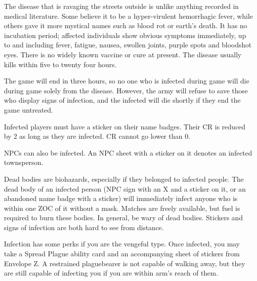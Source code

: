 \documentclass[green]{guildcamp4}
\begin{document}
\name{\gInfection{}}

The disease that is ravaging the streets outside is unlike anything recorded in medical literature. Some believe it to be a hyper-virulent hemorrhagic fever, while others gave it more mystical names such as blood rot or earth's death. It has no incubation period; affected individuals show obvious symptoms immediately, up to and including fever, fatigue, nausea, swollen joints, purple spots and bloodshot eyes. There is no widely known vaccine or cure at present. The disease usually kills within five to twenty four hours.

The game will end in three hours, so no one who is infected during game will die during game solely from the disease. However, the army will refuse to save those who display signs of infection, and the infected will die shortly if they end the game untreated.

Infected players must have a sticker on their name badges. Their CR is reduced by 2 as long as they are infected. CR cannot go lower than 0.

NPCs can also be infected. An NPC sheet with a sticker on it denotes an infected townsperson.

Dead bodies are biohazards, especially if they belonged to infected people. The dead body of an infected person (NPC sign with an X and a sticker on it, or an abandoned name badge with a sticker) will immediately infect anyone who is within one ZOC of it without a mask. Matches are freely available, but fuel is required to burn these bodies. In general, be wary of dead bodies. Stickers and signs of infection are both hard to see from distance.

Infection has some perks if you are the vengeful type. Once infected, you may take a Spread Plague ability card and an accompanying sheet of stickers from Envelope Z. A restrained plaguebearer is not capable of walking away, but they are still capable of infecting you if you are within arm's reach of them.
\end{document}
